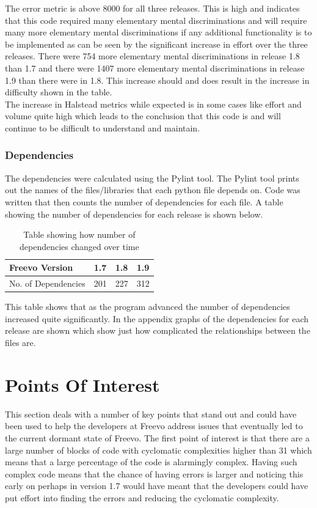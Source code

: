 \documentclass[10.5pt,journal, a4paper]{IEEEtran}
\begin{document}
\noindent
The error metric is above 8000 for all three releases. This is high and indicates that this code required many elementary mental discriminations and will require many more elementary mental discriminations if any additional functionality is to be implemented as can be seen by the significant increase in effort over the three releases. There were 754 more elementary mental discriminations in release 1.8 than 1.7 and there were 1407 more elementary mental discriminations in release 1.9 than there were in 1.8. This increase should and does result in the increase in difficulty shown in the table. \\

\noindent
The increase in Halstead metrics while expected is in some cases like effort and volume quite high which leads to the conclusion that this code is and will continue to be difficult to understand and maintain. 
 

\subsubsection{Dependencies}
\noindent
The dependencies were calculated using the Pylint tool. The Pylint tool prints out the names of the files/libraries that each python file depends on. Code was written that then counts the number of dependencies for each file. A table showing the number of dependencies for each release is shown below. 

\begin{table}[H]
\centering
\caption{Table showing how number of dependencies changed over time}
\label{my-label}
\begin{tabular}{|l|l|l|l|}
\hline
Freevo Version      & 1.7 & 1.8 & 1.9 \\ \hline
No. of Dependencies & 201 & 227 & 312 \\ \hline
\end{tabular}
\end{table}




\noindent
This table shows that as the program advanced the number of dependencies increased quite significantly. In the appendix graphs of the dependencies for each release are shown which show just how complicated the relationships between the files are. 


\section{Points Of Interest}
\noindent
This section deals with a number of key points that stand out and could have been used to help the developers at Freevo address issues that eventually led to the current dormant state of Freevo. The first point of interest is that there are a large number of blocks of code with cyclomatic complexities higher than 31 which means that a large percentage of the code is alarmingly complex. Having such complex code means that the chance of having errors is larger and noticing this early on perhaps in version 1.7 would have meant that the developers could have put effort into finding the errors and reducing the cyclomatic complexity. \\
\end{document}
